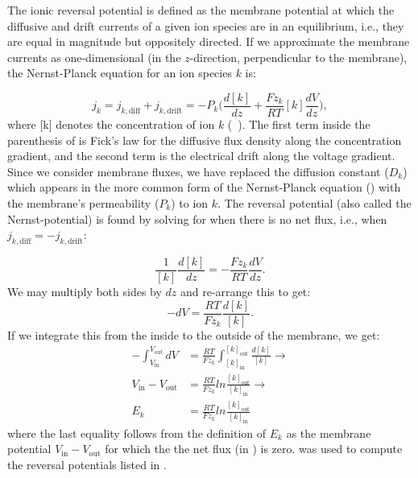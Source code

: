 The ionic reversal potential  is defined as the membrane potential at which the diffusive and drift currents of a given ion species are in an equilibrium, i.e., they are equal in magnitude but oppositely directed. If we approximate the membrane currents as one-dimensional (in the $z$-direction, perpendicular to the membrane), the Nernst-Planck equation for an ion species $k$ is:

\begin{equation}
j_k = j_{k,\text{diff}} + j_{k,\text{drift}} 
=  - P_k \Big(\frac{d[k]}{dz} +  \frac{Fz_k}{RT}  [k] \frac{dV}{dz} \Big), 
\label{eq:Neuron:NP1D}
\end{equation}
where  [k] denotes the concentration of ion $k$ (\si{\milli\molar}). The first term  inside the parenthesis of  is Fick's law for the diffusive flux density along the concentration gradient, and the second term is the electrical drift along the voltage gradient. Since we consider membrane fluxes, we have replaced the diffusion constant ($D_k$) which appears in the more common form of the Nernst-Planck equation () with the membrane's permeability ($P_k$) to ion $k$. The reversal potential (also called the Nernst-potential) is found by solving for when there is no net flux, i.e., when  $j_{k,\text{diff}} = - j_{k,\text{drift}}$:

\begin{equation}
\frac{1}{[k]} \frac{d[k]}{dz} = - \frac{Fz_k}{RT}  \frac{dV}{dz}.
\end{equation}
We may multiply both sides by $dz$ and re-arrange this to get:
\begin{equation}
-dV = \frac{RT}{Fz_k}  \frac{d[k]}{[k]}.
\end{equation}
If we integrate this from the inside to the outside of the membrane, we get:
\begin{align}
-\int_{V_{\text{in}}}^{V_{\text{out}}}  dV &= \frac{RT}{Fz_k}  \int_{[k]_{\text{in}}}^{[k]_{\text{out}}} \frac{d[k]}{[k]} \rightarrow \\
V_{\text{in}}-V_{\text{out}} &= \frac{RT}{Fz_k} ln \frac{[k]_{\text{out}}} {[k]_{\text{in}}} \rightarrow \\
E_k & =  \frac{RT}{Fz_k}  ln \frac{[k]_{\text{out}}} {[k]_{\text{in}}} 
\label{eq:Neuron:revpots}
\end{align}
where the last equality follows from the definition of $E_k$ as the membrane potential $V_{\text{in}}-V_{\text{out}}$ for which the the net flux (in ) is zero.  was used to compute the reversal potentials listed in . 

